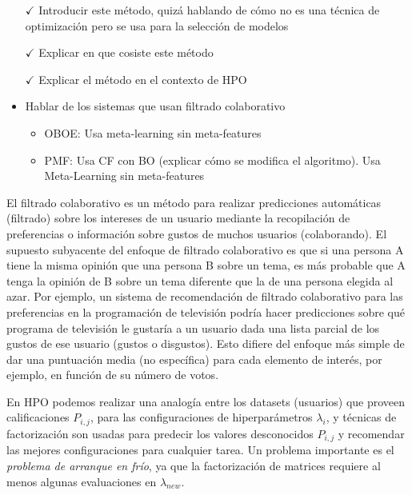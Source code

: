 \begin{itemize}
	\item[$\checkmark$] Introducir este método, quizá hablando de cómo no es una técnica de optimización pero se usa para la selección de modelos
	\item[$\checkmark$] Explicar en que cosiste este método
	\item[$\checkmark$] Explicar el método en el contexto de HPO
	\item Hablar de los sistemas que usan filtrado colaborativo
	\begin{itemize}
		\item OBOE: Usa meta-learning sin meta-features
		\item PMF: Usa CF con BO (explicar cómo se modifica el algoritmo). Usa Meta-Learning sin meta-features
	\end{itemize}
\end{itemize}

El filtrado colaborativo es un método para realizar predicciones automáticas (filtrado) sobre los intereses de un usuario mediante la recopilación de preferencias o información sobre gustos de muchos usuarios (colaborando). El supuesto subyacente del enfoque de filtrado colaborativo es que si una persona A tiene la misma opinión que una persona B sobre un tema, es más probable que A tenga la opinión de B sobre un tema diferente que la de una persona elegida al azar. Por ejemplo, un sistema de recomendación de filtrado colaborativo para las preferencias en la programación de televisión podría hacer predicciones sobre qué programa de televisión le gustaría a un usuario dada una lista parcial de los gustos de ese usuario (gustos o disgustos). Esto difiere del enfoque más simple de dar una puntuación media (no específica) para cada elemento de interés, por ejemplo, en función de su número de votos.

En HPO podemos realizar una analogía entre los datasets (usuarios) que proveen calificaciones $P_{i,j}$, para las configuraciones de hiperparámetros $\lambda_i$, y técnicas de factorización son usadas para predecir los valores desconocidos $P_{i,j}$ y recomendar las mejores configuraciones para cualquier tarea. Un problema importante es el \textit{problema de arranque en frío}, ya que la factorización de matrices requiere al menos algunas evaluaciones en $\lambda_{new}$.

